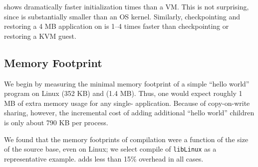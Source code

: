 \sysname{} shows dramatically faster initialization times than a VM. This is not surprising,
since \sysname{} is substantially smaller than an OS kernel. 
Similarly, checkpointing and restoring a 4 MB application on \sysname{} is 1--4 times faster than checkpointing or restoring a KVM guest.




\subsection{Memory Footprint}
\label{sec:graphene:eval:mem}

We begin by measuring the minimal memory footprint of a simple ``hello world'' program 
on Linux (352 KB) and \sysname{} (1.4 MB).
Thus, one would expect roughly 1 MB of extra memory usage for any single-\picoproc{} application.
Because of copy-on-write sharing, however, the incremental cost of adding additional ``hello world'' children
is only about 790 KB per process.

%


We found that the memory footprints of compilation were a function of the 
size of the source base, even on Linux; we select compile of {\tt libLinux} as a representative example.
\sysname{} adds less than 15\% overhead in all cases.

